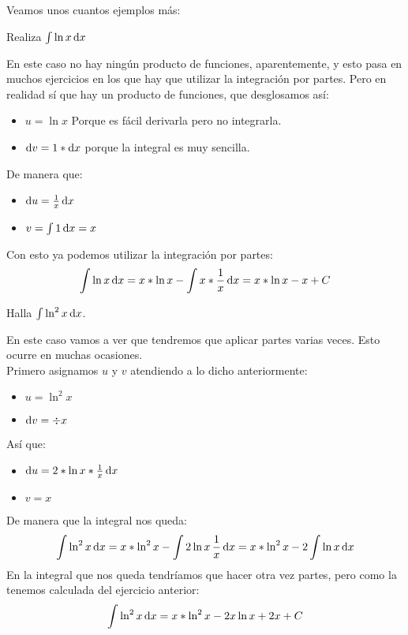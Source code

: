 \documentclass[a4paper,11pt,answers]{exam}
\begin{document}
Veamos unos cuantos ejemplos más:
\begin{questions}
\question Realiza $\int \ln x\,\mathrm{d}x$
\begin{solution}
En este caso no hay ningún producto de funciones, aparentemente, y esto pasa en muchos ejercicios en los que hay que utilizar la integración por partes. Pero en realidad sí que hay un producto de funciones, que desglosamos así:
\begin{itemize}
	\item $u = \ln x$ Porque es fácil derivarla pero no integrarla.
	\item $\mathrm{d}v = 1 * \mathrm{d}x$ porque la integral es muy sencilla.
\end{itemize}
De manera que:
\begin{itemize}
	\item $\mathrm{d}u = \frac{1}{x}\, \mathrm{d}x$
	\item $v = \int 1\,\mathrm{d}x = x$
\end{itemize}
Con esto ya podemos utilizar la integración por partes:
\[\int \ln x\,\mathrm{d}x = x*\ln x - \int x*\frac{1}{x}\,\mathrm{d}x =
x*\ln x - x + C\]
\end{solution}

\question Halla $\int \ln^2 x\,\mathrm{d}x$.
\begin{solution}
En este caso vamos a ver que tendremos que aplicar partes varias veces. Esto ocurre en muchas ocasiones.\\
Primero asignamos $u$ y $v$ atendiendo a lo dicho anteriormente:
\begin{itemize}
	\item $u = \ln^2 x$
	\item $\mathrm{d}v = \div{x}$
\end{itemize}
Así que:
\begin{itemize}
	\item $\mathrm{d}u = 2*\ln x * \frac{1}{x}\,\mathrm{d}x$
	\item $v = x$
\end{itemize}
De manera que la integral nos queda:
\[\int \ln^2 x\,\mathrm{d}x = x*\ln^2 x - \int 2\ln x\,\frac{1}{x}\,\mathrm{d}x = x*\ln^2 x - 2\int \ln x\,\mathrm{d}x\]
En la integral que nos queda tendríamos que hacer otra vez partes, pero como la tenemos calculada del ejercicio anterior:
\[\int \ln^2 x\,\mathrm{d}x = x*\ln^2 x - 2x\ln x + 2x + C\]
\end{solution}


\end{questions}
\end{document}
